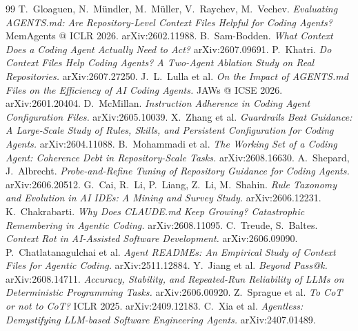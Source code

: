 \documentclass[10pt,twocolumn,a4paper]{article}
\begin{document}
\vspace{-17pt}
\begin{thebibliography}{99}\footnotesize
\setlength{\itemsep}{0pt}\setlength{\parskip}{0pt}
 T.~Gloaguen, N.~M\"undler, M.~M\"uller, V.~Raychev, M.~Vechev.
\emph{Evaluating AGENTS.md: Are Repository-Level Context Files Helpful for Coding
Agents?} MemAgents @ ICLR 2026. arXiv:2602.11988.
 B.~Sam-Bodden. \emph{What Context Does a Coding Agent Actually
Need to Act?} arXiv:2607.09691.
 P.~Khatri. \emph{Do Context Files Help Coding Agents? A Two-Agent
Ablation Study on Real Repositories.} arXiv:2607.27250.
 J.~L.~Lulla et al. \emph{On the Impact of AGENTS.md Files on the
Efficiency of AI Coding Agents.} JAWs @ ICSE 2026. arXiv:2601.20404.
 D.~McMillan. \emph{Instruction Adherence in Coding Agent
Configuration Files.} arXiv:2605.10039.
 X.~Zhang et al. \emph{Guardrails Beat Guidance: A Large-Scale Study
of Rules, Skills, and Persistent Configuration for Coding Agents.} arXiv:2604.11088.
 B.~Mohammadi et al. \emph{The Working Set of a Coding Agent:
Coherence Debt in Repository-Scale Tasks.} arXiv:2608.16630.
 A.~Shepard, J.~Albrecht. \emph{Probe-and-Refine Tuning of
Repository Guidance for Coding Agents.} arXiv:2606.20512.
 G.~Cai, R.~Li, P.~Liang, Z.~Li, M.~Shahin. \emph{Rule Taxonomy and
Evolution in AI IDEs: A Mining and Survey Study.} arXiv:2606.12231.
 K.~Chakrabarti. \emph{Why Does CLAUDE.md Keep Growing?
Catastrophic Remembering in Agentic Coding.} arXiv:2608.11095.
 C.~Treude, S.~Baltes. \emph{Context Rot in AI-Assisted Software
Development.} arXiv:2606.09090.
 P.~Chatlatanagulchai et al. \emph{Agent READMEs: An
Empirical Study of Context Files for Agentic Coding.} arXiv:2511.12884.
 Y.~Jiang et al. \emph{Beyond Pass@k.} arXiv:2608.14711.
 \emph{Accuracy, Stability, and Repeated-Run Reliability of
LLMs on Deterministic Programming Tasks.} arXiv:2606.00920.
 Z.~Sprague et al. \emph{To CoT or not to CoT?} ICLR 2025.
arXiv:2409.12183.
 C.~Xia et al. \emph{Agentless: Demystifying LLM-based Software
Engineering Agents.} arXiv:2407.01489.
\end{thebibliography}
\end{document}
